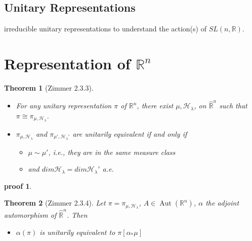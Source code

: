 \documentclass[
  12pt
]{article}
\theoremstyle{break}
\newtheorem{thm}{Theorem}
\theoremstyle{plain}
\newtheorem*{pf}{proof}
\newcommand{\bbr}{\ensuremath{\mathbb{R}}}
\newcommand{\hilb}{\ensuremath{\mathscr{H}}}
\DeclareMathOperator{\Aut}{Aut}
\begin{document}
  \hypertarget{unitary-representations}{%
  \subsection{Unitary Representations}\label{unitary-representations}}


  irreducible unitary representations to understand the action(s) of
  $SL(n, \mathbb{R})$.




\hypertarget{representation-of-rn}{%
\section{Representation of \texorpdfstring{$\bbr^n$}{R\^{}n}}\label{representation-of-rn}}


  \begin{thm}[Zimmer 2.3.3]
    \label{thm:2.3.3}
    \begin{itemize}
      \item For any unitary representation $\pi$ of
        $\mathbb{R}^n$, there exist $\mu, \mathscr{H}_{\lambda}$, on
        $\hat{\mathbb{R}}^n$ such that $\pi \cong \pi_{\mu, \mathscr{H}_{\lambda}}$.
      \item $\pi_{\mu, \mathscr{H}_{\lambda}}$ and
        $\pi_{\mu', \mathscr{H}_{\lambda}'}$ are unitarily equivalent if and only if 
        \begin{itemize}
          \item $\mu \sim \mu'$, i.e., they are in the same measure class
          \item and $dim\mathscr{H}_{\lambda} = dim \mathscr{H}_{\lambda}'$ a.e.
        \end{itemize}
    \end{itemize}
  \end{thm}

  \begin{pf}
    \label{pf2.3.3}
  \end{pf}

  \begin{thm}[Zimmer 2.3.4]
    \label{thm:2.3.4}
    Let $\pi = \pi_{\mu, \hilb_{\lambda}}$, $A\in  \Aut(\bbr^n)$, $\alpha$ the
    adjoint automorphism of $\hat{\bbr}^n$. Then
    \begin{itemize}
      \item $\alpha(\pi)$ is unitarily equivalent to $\pi[\alpha_*\mu]$
    \end{itemize}
  \end{thm}
\end{document}
